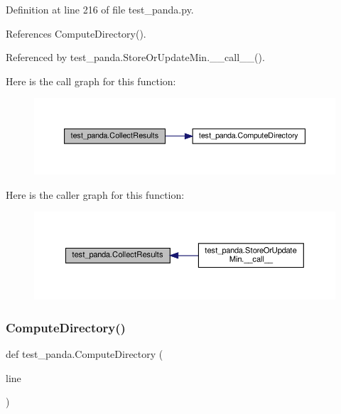 Definition at line 216 of file test\+\_\+panda.\+py.



References Compute\+Directory().



Referenced by test\+\_\+panda.\+Store\+Or\+Update\+Min.\+\_\+\+\_\+call\+\_\+\+\_\+().

Here is the call graph for this function\+:
\nopagebreak
\begin{figure}[H]
\begin{center}
\leavevmode
\includegraphics[width=350pt]{d0/dee/namespacetest__panda_a1c27d2a971da90549c473b4553865357_cgraph}
\end{center}
\end{figure}
Here is the caller graph for this function\+:
\nopagebreak
\begin{figure}[H]
\begin{center}
\leavevmode
\includegraphics[width=350pt]{d0/dee/namespacetest__panda_a1c27d2a971da90549c473b4553865357_icgraph}
\end{center}
\end{figure}
\mbox{\label{namespacetest__panda_aecad727491366ab009da0c1bc773571e}} 
\subsubsection{\texorpdfstring{Compute\+Directory()}{ComputeDirectory()}}
{\footnotesize\ttfamily def test\+\_\+panda.\+Compute\+Directory (\begin{DoxyParamCaption}\item[{}]{line }\end{DoxyParamCaption})}




